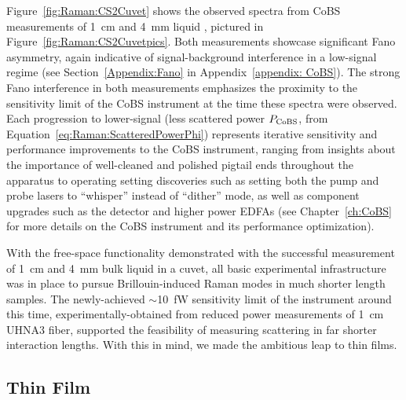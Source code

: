 Figure~\ref{fig:Raman:CS2Cuvet} shows the observed spectra from \ac{CoBS} measurements of \SI{1}{\centi\meter} and \SI{4}{\milli\meter} liquid , pictured in Figure~\ref{fig:Raman:CS2Cuvetpics}. Both measurements showcase significant Fano asymmetry, again indicative of signal-background interference in a low-signal regime (see Section~\ref{Appendix:Fano} in Appendix~\ref{appendix: CoBS}). The strong Fano interference in both measurements emphasizes the proximity to the sensitivity limit of the \ac{CoBS} instrument at the time these spectra were observed. Each progression to lower-signal (less scattered power \(P_{\rm CoBS}\), from Equation~\ref{eq:Raman:ScatteredPowerPhi}) represents iterative sensitivity and performance improvements to the \ac{CoBS} instrument, ranging from insights about the importance of well-cleaned and polished pigtail ends throughout the apparatus to operating setting discoveries such as setting both the pump and probe lasers to ``whisper'' instead of ``dither'' mode, as well as component upgrades such as the detector and higher power \ac{EDFA}s (see Chapter~\ref{ch:CoBS} for more details on the \ac{CoBS} instrument and its performance optimization).

With the free-space functionality demonstrated with the successful measurement of \SI{1}{\centi\meter} and \SI{4}{\milli\meter} bulk liquid  in a cuvet, all basic experimental infrastructure was in place to pursue Brillouin-induced Raman modes in much shorter length samples. The newly-achieved \(\sim\)\SI{10}{\femto\watt} sensitivity limit of the instrument around this time, experimentally-obtained from reduced power measurements of \SI{1}{\centi\meter} \ac{UHNA3} fiber, supported the feasibility of measuring scattering in far shorter interaction lengths. With this in mind, we made the ambitious leap to thin films.

\subsection{\texorpdfstring{}{TeO2} Thin Film}
\label{subsec:Raman:Target:TeO2}

